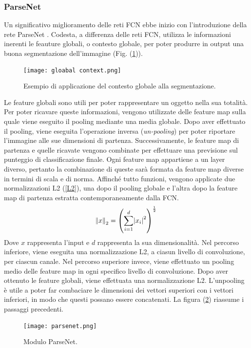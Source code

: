 \subsubsection{ParseNet}
Un significativo miglioramento delle reti FCN ebbe inizio con l’introduzione della 
rete ParseNet \cite{parsenet}. Codesta, a differenza delle reti FCN, utilizza le informazioni 
inerenti le feauture globali, o contesto globale, per poter produrre in output una 
buona segmentazione dell’immagine (Fig. (\ref{global context})).
\begin{figure}
    \centering
    \texttt{[image: gloabal context.png]}
    \centering
    \caption{Esempio di applicazione del contesto globale alla segmentazione.}
    \label{global context}
\end{figure}
Le feature globali sono utili per poter rappresentare un oggetto nella sua 
totalità. Per poter ricavare queste informazioni, vengono utilizzate delle feature 
map sulla quale viene eseguito il pooling mediante una media globale. Dopo aver 
effettuato il pooling, viene eseguita l’operazione inversa (\emph{un-pooling}) per poter 
riportare l’immagine alle sue dimensioni di partenza. Successivamente, le feature 
map di partenza e quelle ricavate vengono combinate per effettuare una previsione 
sul punteggio di classificazione finale. Ogni feature map appartiene a un layer 
diverso, pertanto la combinazione di queste sarà formata da feature map diverse 
in termini di scala e di norma. Affinché tutto funzioni, vengono applicate due 
normalizzazioni L2 (\ref{L2}), una dopo il pooling globale e l’altra dopo la feature 
map di partenza estratta contemporaneamente dalla FCN. 
\begin{equation}\label{L2}
    \norm{x}_2 = \left(\sum_{i=1}^d \abs{x_i}^2 \right)^\frac{1}{2}
\end{equation}
Dove $x$ rappresenta l’input e $d$ rappresenta la sua dimensionalità. Nel percorso 
inferiore, viene eseguita una normalizzazione L2, a ciasun livello di convoluzione, 
per ciascun canale. Nel percorso superiore invece, viene effettuato un pooling 
medio delle feature map in ogni specifico livello di convoluzione. Dopo aver 
ottenuto le feature globali, viene effettuata una normalizzazione L2. L’unpooling 
è utile a poter far combaciare le dimensioni dei vettori superiori con i vettori 
inferiori, in modo che questi possano essere concatenati. La figura (\ref{parsenet}) riassume 
i passaggi precedenti.
\begin{figure}
    \centering
    \texttt{[image: parsenet.png]}
    \centering
    \caption{Modulo ParseNet.}
    \label{parsenet}
\end{figure}

